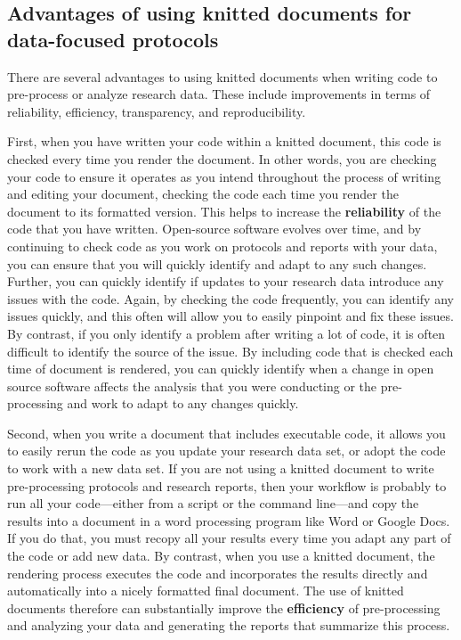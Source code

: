 \documentclass[]{tufte-book}
\begin{document}
\subsection{Advantages of using knitted documents for data-focused protocols}\label{advantages-of-using-knitted-documents-for-data-focused-protocols}

There are several advantages to using knitted documents when writing code to
pre-process or analyze research data. These include improvements in terms of
reliability, efficiency, transparency, and reproducibility.

First, when you have written your code within a knitted document, this code is
checked every time you render the document. In other words, you are checking
your code to ensure it operates as you intend throughout the process of writing
and editing your document, checking the code each time you render the document
to its formatted version. This helps to increase the \textbf{reliability} of the code
that you have written. Open-source software evolves over time, and by continuing
to check code as you work on protocols and reports with your data, you can
ensure that you will quickly identify and adapt to any such changes. Further,
you can quickly identify if updates to your research data introduce any issues
with the code. Again, by checking the code frequently, you can identify any
issues quickly, and this often will allow you to easily pinpoint and fix these
issues. By contrast, if you only identify a problem after writing a lot of code,
it is often difficult to identify the source of the issue. By including code
that is checked each time of document is rendered, you can quickly identify when
a change in open source software affects the analysis that you were conducting
or the pre-processing and work to adapt to any changes quickly.

Second, when you write a document that includes executable code, it allows you
to easily rerun the code as you update your research data set, or adopt the code
to work with a new data set. If you are not using a knitted document to write
pre-processing protocols and research reports, then your workflow is probably to
run all your code---either from a script or the command line---and copy the
results into a document in a word processing program like Word or Google Docs.
If you do that, you must recopy all your results every time you adapt any part
of the code or add new data. By contrast, when you use a knitted document, the
rendering process executes the code and incorporates the results directly and
automatically into a nicely formatted final document. The use of knitted
documents therefore can substantially improve the \textbf{efficiency} of
pre-processing and analyzing your data and generating the reports that summarize
this process.
\end{document}
